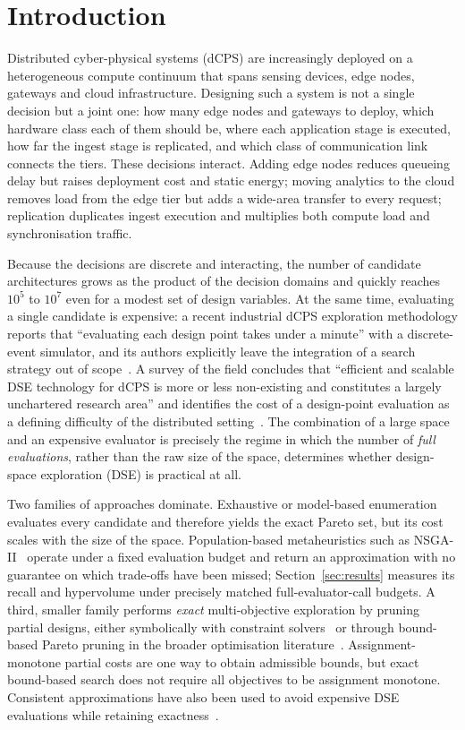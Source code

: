 \section{Introduction}
\label{sec:intro}

Distributed cyber-physical systems (dCPS) are increasingly deployed on a heterogeneous
compute continuum that spans sensing devices, edge nodes, gateways and cloud
infrastructure. Designing such a system is not a single decision but a joint one: how
many edge nodes and gateways to deploy, which hardware class each of them should be,
where each application stage is executed, how far the ingest stage is replicated, and
which class of communication link connects the tiers. These decisions interact. Adding
edge nodes reduces queueing delay but raises deployment cost and static energy; moving
analytics to the cloud removes load from the edge tier but adds a wide-area transfer to
every request; replication duplicates ingest execution and multiplies both compute load
and synchronisation traffic.

Because the decisions are discrete and interacting, the number of candidate
architectures grows as the product of the decision domains and quickly reaches $10^{5}$
to $10^{7}$ even for a modest set of design variables. At the same time, evaluating a
single candidate is expensive: a recent industrial dCPS exploration methodology reports
that ``evaluating each design point takes under a minute'' with a discrete-event
simulator, and its authors explicitly leave the integration of a search strategy out of
scope~\cite{saadatmand2025compdse}. A survey of the field concludes that ``efficient and
scalable DSE technology for dCPS is more or less non-existing and constitutes a largely
unchartered research area'' and identifies the cost of a design-point evaluation as a
defining difficulty of the distributed setting~\cite{herget2022dse}. The combination of
a large space and an expensive evaluator is precisely the regime in which the number of
\emph{full evaluations}, rather than the raw size of the space, determines whether
design-space exploration (DSE) is practical at all.

Two families of approaches dominate. Exhaustive or model-based enumeration evaluates
every candidate and therefore yields the exact Pareto set, but its cost scales with the
size of the space. Population-based metaheuristics such as NSGA-II~\cite{deb2002nsga2}
operate under a fixed evaluation budget and return an approximation with no guarantee on
which trade-offs have been missed; Section~\ref{sec:results} measures its recall and hypervolume under precisely matched full-evaluator-call budgets. A third, smaller family performs \emph{exact}
multi-objective exploration by pruning partial designs, either symbolically with
constraint solvers~\cite{neubauer2018exact,haubelt2018asp} or through bound-based Pareto
pruning in the broader optimisation literature~\cite{paretopruning2022,mandow2010namoa}.
Assignment-monotone partial costs are one way to obtain admissible bounds,
but exact bound-based search does not require all objectives to be assignment
monotone. Consistent approximations have also been used to avoid expensive
DSE evaluations while retaining exactness~\cite{neubauer2020consistent}.

